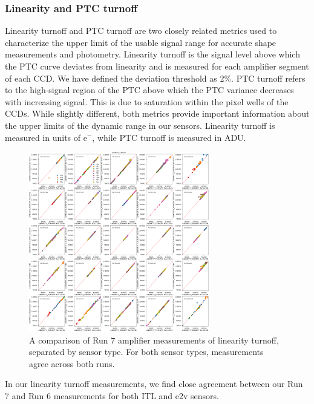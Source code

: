 \clearpage
\subsubsection{Linearity and PTC turnoff}\label{linearity-and-ptc-turnoff}

Linearity turnoff and PTC turnoff are two closely related metrics used
to characterize the upper limit of the usable signal range for accurate shape measurements and photometry. Linearity turnoff is the signal level above which the PTC curve deviates from
linearity and is measured for each amplifier segment of each CCD. We have defined the deviation threshold as 2\%.
PTC turnoff refers to the high-signal region of the PTC above which the PTC
variance decreases with increasing signal. This is due to saturation within the pixel wells of the CCDs. While slightly different, both metrics
provide important information about the upper limits of the dynamic
range in our sensors. Linearity turnoff is measured in units of e$^-$,
while PTC turnoff is measured in ADU.

\begin{figure}[ht]
\begin{centering}
\includegraphics[width=0.7\textwidth]{figures/baselineCharacterization/13591_E749_LINEARITY_TURNOFF.png}
\caption{A comparison of Run 7 amplifier measurements of linearity turnoff, separated by sensor type. For both sensor types, measurements agree across both runs.}
\end{centering}
\end{figure}

In our linearity turnoff measurements, we find close agreement between
our Run 7 and Run 6 measurements for both ITL and e2v sensors.

